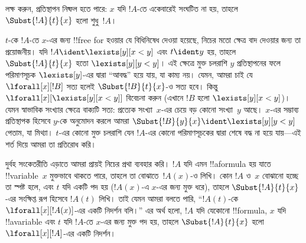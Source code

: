 \documentclass[../../../include/open-logic-section]{subfiles}
\begin{document}
\begin{explain}
লক্ষ করুন, প্রতিস্থাপন নিষ্ফল হতে পারে: $x$ যদি $!A$-তে একেবারেই
সংঘটিত না হয়, তাহলে $\Subst{!A}{t}{x}$ হলো শুধু~$!A$।

$t$-কে $!A$-তে $x$-এর জন্য !!{free for} হওয়ার যে বিধিনিষেধ দেওয়া
হয়েছে, নিচের মতো ক্ষেত্র বাদ দেওয়ার জন্য তা প্রয়োজনীয়। যদি
$!A \ident \lexists[y][x < y]$ এবং $t \ident y$ হয়, তাহলে
$\Subst{!A}{t}{x}$ হতো $\lexists[y][y < y]$। এই ক্ষেত্রে মুক্ত
চলরাশি $y$ প্রতিস্থাপনের ফলে পরিমাণসূচক $\lexists[y]$-এর দ্বারা
“আবদ্ধ” হয়ে যায়, যা কাম্য নয়। যেমন, আমরা চাই যে
$\lforall[x][!B]$ সত্য হলেই $\Subst{!B}{t}{x}$-ও সত্য হবে। কিন্তু
$\lforall[x][\lexists[y][x < y]]$ বিবেচনা করুন (এখানে $!B$ হলো
$\lexists[y][x < y]$)। যেমন স্বাভাবিক সংখ্যার ক্ষেত্রে বাক্যটি সত্য:
প্রত্যেক সংখ্যা~$x$-এর চেয়ে বড় কোনো সংখ্যা~$y$ আছে। $x$-এর সম্ভাব্য
প্রতিস্থাপক হিসেবে $y$-কে অনুমোদন করলে আমরা
$\Subst{!B}{y}{x} \ident \lexists[y][y < y]$ পেতাম, যা মিথ্যা।
$t$-এর কোনো মুক্ত চলরাশি যেন $!A$-এর কোনো পরিমাণসূচকের দ্বারা শেষে
বদ্ধ না হয়ে যায়—এই শর্ত দিয়ে আমরা তা প্রতিরোধ করি।
\end{explain}

দুর্বহ সংকেতরীতি এড়াতে আমরা প্রায়ই নিচের প্রথা ব্যবহার করি। $!A$ যদি
এমন !!a{formula} হয় যাতে !!{variable}~$x$ মুক্তভাবে থাকতে পারে, তাহলে
তা বোঝাতে~$!A(x)$-ও লিখি। কোন $!A$ ও~$x$ বোঝানো হচ্ছে তা স্পষ্ট হলে,
এবং $t$ যদি একটি পদ হয় ($!A(x)$-এ $x$-এর জন্য মুক্ত ধরে), তাহলে
$\Subst{!A}{t}{x}$-এর সংক্ষিপ্ত রূপ হিসেবে $!A(t)$ লিখি। তাই যেমন আমরা
বলতে পারি, “$!A(t)$-কে $\lforall[x][!A(x)]$-এর একটি নিদর্শন বলি।”
এর অর্থ হলো, $!A$ যদি যেকোনো !!{formula}, $x$ যদি !!a{variable} এবং
$t$ যদি $!A$-তে $x$-এর জন্য মুক্ত পদ হয়, তাহলে $\Subst{!A}{t}{x}$
হলো $\lforall[x][!A]$-এর একটি নিদর্শন।
\end{document}
